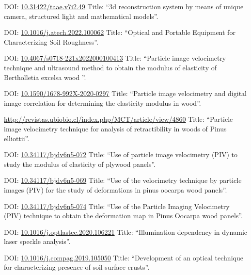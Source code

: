 \documentclass[11pt,a4paper,sans]{moderncv} %
\newcommand{\doiurl}[1]{\href{https://doi.org/#1}{#1}}
\begin{document}
	      {DOI: \doiurl{10.31422/taae.v7i2.49} }{}{}
	      {Title: ``3d reconstruction system by means of unique camera, structured light and mathematical models''.}

	      {DOI: \doiurl{10.1016/j.atech.2022.100062} }{}{}
	      {Title: ``Optical and Portable Equipment for Characterizing Soil Roughness''.}
	      
	      {DOI: \doiurl{10.4067/s0718-221x2022000100413} }{}{}
	      {Title: ``Particle image velocimetry technique and ultrasound method to obtain the modulus of elasticity of Bertholletia excelsa wood ''.}
	      
	      {DOI: \doiurl{10.1590/1678-992X-2020-0297} }{}{}
	      {Title: ``Particle image velocimetry and digital image correlation for determining the elasticity modulus in wood''.}
	      
	      {\url{http://revistas.ubiobio.cl/index.php/MCT/article/view/4860}}{}{}
	      {Title: ``Particle image velocimetry technique for analysis of retractibility in woods of Pinus elliottii''.}
	      
	      {DOI: \doiurl{10.34117/bjdv6n5-072}}{}{}
	      {Title: ``Use of particle image velocimetry (PIV) to study the modulus of elasticity of plywood panels''.}

	      {DOI: \doiurl{10.34117/bjdv6n5-069}}{}{}
	      {Title: ``Use of the velocimetry technique by particle images (PIV) for the study of deformations in pinus oocarpa wood panels''.}

	      {DOI: \doiurl{10.34117/bjdv6n5-074}}{}{}
	      {Title: ``Use of the Particle Imaging Velocimetry (PIV) technique to obtain the deformation map in Pinus Oocarpa wood panels''.}

	      {DOI: \doiurl{10.1016/j.optlastec.2020.106221}}{}{}
	      {Title: ``Illumination dependency in dynamic laser speckle analysis''.}

	      {DOI: \doiurl{10.1016/j.compag.2019.105050}}{}{}
	      {Title: ``Development of an optical technique for characterizing presence of soil surface crusts''.}
\end{document}
